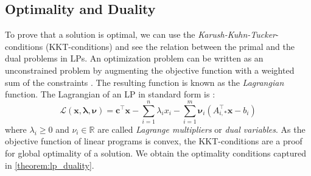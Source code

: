 \subsection{Optimality and Duality}
To prove that a solution is optimal, we can use the \textit{Karush-Kuhn-Tucker}-conditions (KKT-conditions) and see the relation between the primal and the dual problems in LPs. 
An optimization problem can be written as an unconstrained problem by augmenting the objective function with a weighted sum of the constraints \cite{boyd_stephen_convex_2004}. The resulting function is known as the \textit{Lagrangian} function.
The Lagrangian of an LP in standard form is \cite{noauthor_numerical_2006}: 
\begin{equation} \label{Eq:lagrangian}
\mathcal{L} (\mathbf x, \boldsymbol{\lambda}, \boldsymbol \nu) = \mathbf c^\intercal \mathbf x - \sum_{i=1}^n \lambda_i x_i - \sum_{i=1}^m \mathbf \nu_i (A_{i,*}^\intercal \mathbf x - b_i)
\end{equation} %
 where $\lambda_i \geq 0$ and $\nu_i \in \mathbb{R}$ are called \textit{Lagrange multipliers} or \textit{dual variables}.
As the objective function of linear programs is convex, the KKT-conditions are a proof for global optimality of a solution. We obtain the optimality conditions captured in \cref{theorem:lp_duality}. 

